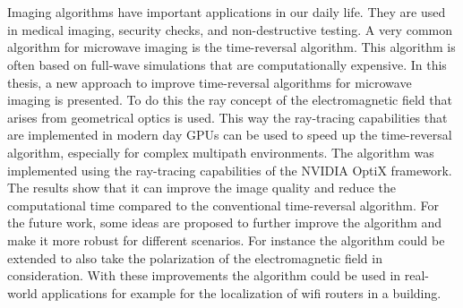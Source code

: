 \chapter{\abstractname}

Imaging algorithms have important applications in our daily life. They are used in medical imaging, security checks, and non-destructive testing. 
A very common algorithm for microwave imaging is the time-reversal algorithm.
This algorithm is often based on full-wave simulations that are computationally expensive.
In this thesis, a new approach to improve time-reversal algorithms for microwave imaging is presented.
To do this the ray concept of the electromagnetic field that arises from geometrical optics is used.
This way the ray-tracing capabilities that are implemented in modern day GPUs can be used to speed up the time-reversal algorithm, especially for complex multipath environments.
The algorithm was implemented using the ray-tracing capabilities of the NVIDIA OptiX framework.
The results show that it can improve the image quality and reduce the computational time compared to the conventional time-reversal algorithm.
For the future work, some ideas are proposed to further improve the algorithm and make it more robust for different scenarios.
For instance the algorithm could be extended to also take the polarization of the electromagnetic field in consideration.
With these improvements the algorithm could be used in real-world applications for example for the localization of wifi routers in a building.
